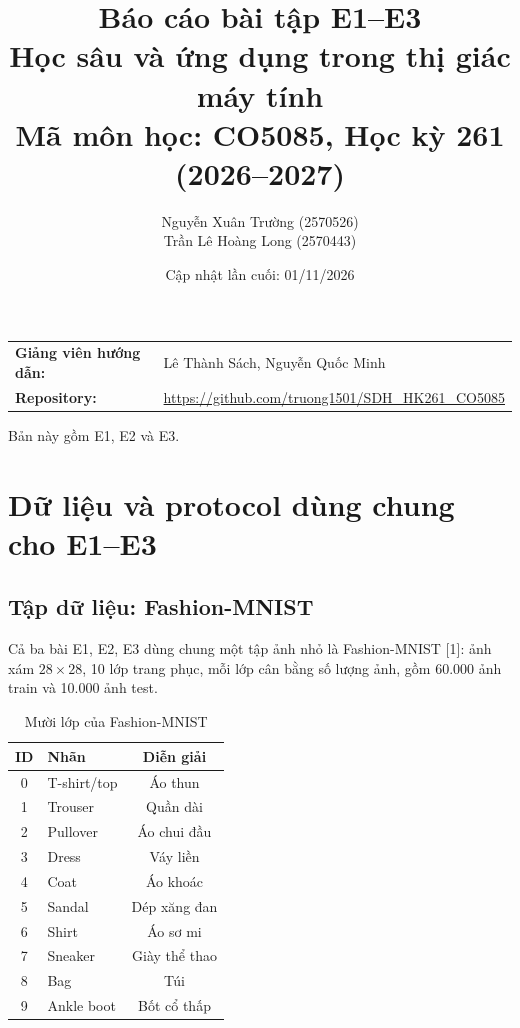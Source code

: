 \documentclass[12pt,a4paper]{article}
\title{\textbf{Báo cáo bài tập E1--E3}\\[0.3em]
\large Học sâu và ứng dụng trong thị giác máy tính\\
Mã môn học: CO5085, Học kỳ 261 (2026--2027)}
\author{
Nguyễn Xuân Trường (2570526) \\
Trần Lê Hoàng Long (2570443)
}
\date{Cập nhật lần cuối: 01/11/2026}
\begin{document}
\maketitle

\vspace{1cm}
\begin{center}
\begin{tabular}{ll}
\textbf{Giảng viên hướng dẫn:} & Lê Thành Sách, Nguyễn Quốc Minh \\
\textbf{Repository:} & \url{https://github.com/truong1501/SDH_HK261_CO5085} \\
\end{tabular}
\end{center}

\vspace{0.5cm}
\begin{center}
Bản này gồm E1, E2 và E3.
\end{center}

\clearpage
\tableofcontents
\clearpage

\section{Dữ liệu và protocol dùng chung cho E1--E3}

\subsection{Tập dữ liệu: Fashion-MNIST}

Cả ba bài E1, E2, E3 dùng chung một tập ảnh nhỏ là Fashion-MNIST [1]: ảnh xám
$28 \times 28$, 10 lớp trang phục, mỗi lớp cân bằng số lượng ảnh, gồm 60.000
ảnh train và 10.000 ảnh test.

\begin{table}[H]
\centering
\caption{Mười lớp của Fashion-MNIST}
\begin{tabular}{clc}
\toprule
ID & Nhãn & Diễn giải \\
\midrule
0 & T-shirt/top & Áo thun \\
1 & Trouser & Quần dài \\
2 & Pullover & Áo chui đầu \\
3 & Dress & Váy liền \\
4 & Coat & Áo khoác \\
5 & Sandal & Dép xăng đan \\
6 & Shirt & Áo sơ mi \\
7 & Sneaker & Giày thể thao \\
8 & Bag & Túi \\
9 & Ankle boot & Bốt cổ thấp \\
\bottomrule
\end{tabular}
\end{table}
\end{document}
